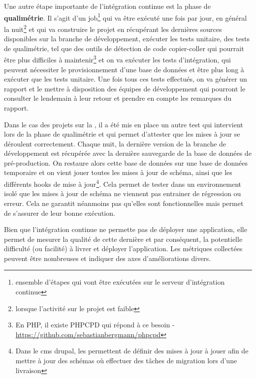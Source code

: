 Une autre étape importante de l'intégration continue est la phase de \textbf{qualimétrie}. Il s'agit d'un job\footnote{ensemble d'étapes qui vont être exécutées sur le serveur d'intégration continue} qui va être exécuté une fois par jour, en général la nuit\footnote{lorsque l'activité sur le projet est faible} et qui va construire le projet en récupérant les dernières sources disponibles sur la branche de développement, exécuter les tests unitaire, des tests de qualimétrie, tel que des outils de détection de code  copier-coller qui pourrait être plus difficiles à maintenir\footnote{En \gls{PHP}, il existe PHPCPD qui répond à ce besoin - \url{https://github.com/sebastianbergmann/phpcpd}} et on va exécuter les tests d'intégration, qui peuvent nécessiter le provisionnement d'une base de données et être plus long à exécuter que les tests unitaire. Une fois tous ces tests effectués, on va générer un rapport et le mettre à disposition des équipes de développement qui pourront le consulter le lendemain à leur retour et prendre en compte les remarques du rapport. 

Dans le cas des projets sur la \naq{}, il a été mis en place un autre test qui intervient lors de la phase de qualimétrie et qui permet d'attester que les mises à jour se déroulent correctement. Chaque nuit, la dernière version de la branche de développement est récupérée avec la dernière sauvegarde de la base de données de pré-production. On restaure alors cette base de données sur une base de données temporaire et on vient jouer toutes les mises à jour de schéma, ainsi que les différents hooks de mise à jour\footnote{Dans le \gls{cms} \gls{drupal}, les  permettent de définir des mises à jour à jouer afin de mettre à jour des schémas où effectuer des tâches de migration lors d'une livraison}. Cela permet de tester dans un environnement isolé que les mises à jour de schéma ne viennent pas entrainer de régression ou erreur. Cela ne garantit néanmoins pas qu'elles sont fonctionnelles mais permet de s'assurer de leur bonne exécution.

Bien que l'intégration continue ne permette pas de déployer une application, elle permet de mesurer la qualité de cette dernière et par conséquent, la potentielle difficulté (ou facilité) à livrer et déployer l'application. Les métriques collectées peuvent être nombreuses et indiquer des axes d'améliorations divers.


